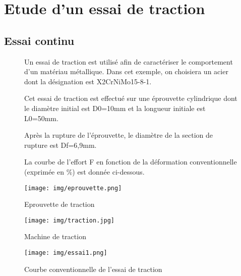 

\section{Etude d'un essai de traction}

\subsection{Essai continu}

\begin{figure}[!h]
 \begin{minipage}{0.6\linewidth}
Un essai de traction est utilisé afin de caractériser le comportement d'un  matériau métallique. Dans cet exemple, on choisiera un acier dont la désignation est X2CrNiMo15-8-1.

Cet essai de traction est effectué sur une éprouvette cylindrique dont le diamètre initial est D0=10mm et la longueur initiale est L0=50mm.

Après la rupture de l'éprouvette, le diamètre de la section de rupture est Df=6,9mm.

La courbe de l'effort F en fonction de la déformation conventionnelle (exprimée en \%) est donnée ci-dessous.

\vspace{1cm}

\centering\texttt{[image: img/eprouvette.png]}
  \caption{Eprouvette de traction}
  \label{img:image1}
 \end{minipage}
\hfill
 \begin{minipage}{0.35\linewidth}
  \centering\texttt{[image: img/traction.jpg]}
  \caption{Machine de traction}
  \label{img:image2}
 \end{minipage}
\end{figure}

\begin{figure}[!h]
  \centering\texttt{[image: img/essai1.png]}
  \caption{Courbe conventionnelle de l'essai de traction}
  \label{img:image3}
\end{figure}

